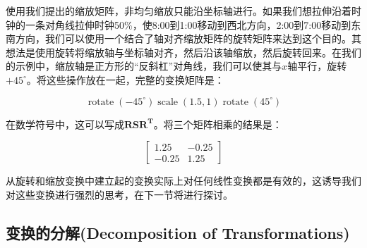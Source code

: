 \begin{example}
	使用我们提出的缩放矩阵，非均匀缩放只能沿坐标轴进行。如果我们想拉伸沿着时钟的一条对角线拉伸时钟50\%，使8:00到1:00移动到西北方向，2:00到7:00移动到东南方向，我们可以使用一个结合了轴对齐缩放矩阵的旋转矩阵来达到这个目的。其想法是使用旋转将缩放轴与坐标轴对齐，然后沿该轴缩放，然后旋转回来。在我们的示例中，缩放轴是正方形的“反斜杠”对角线，我们可以使其与$x$轴平行，旋转$+45^{\circ}$。将这些操作放在一起，完整的变换矩阵是：
	
	\begin{equation}
		\operatorname{rotate}\left(-45^{\circ}\right) \operatorname{scale}(1.5,1) \operatorname{rotate}\left(45^{\circ}\right)
		\nonumber
	\end{equation}
	
	在数学符号中，这可以写成$\mathbf{R}\mathbf{S}\mathbf{R}^{\mathbf{T}}$。将三个矩阵相乘的结果是：
	
	\begin{equation}
		\left[\begin{array}{cc}
			1.25 & -0.25 \\
			-0.25 & 1.25
		\end{array}\right]
	\nonumber
	\end{equation}
	
	从旋转和缩放变换中建立起的变换实际上对任何线性变换都是有效的，这诱导我们对这些变换进行强烈的思考，在下一节将进行探讨。
	
\end{example}

\subsection{变换的分解(Decomposition of Transformations)}


